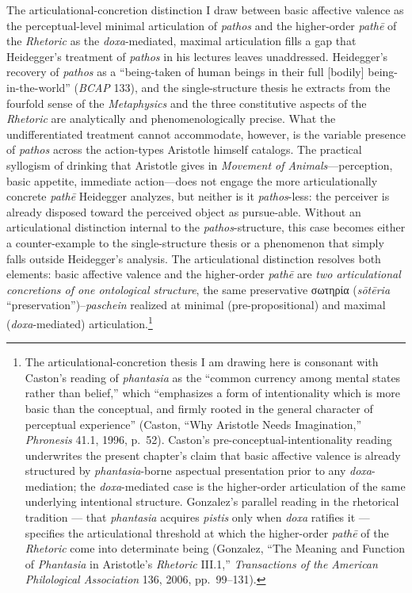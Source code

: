 \documentclass{article}
\newcommand{\gk}[1]{{\greekfont #1}}
\begin{document}
The articulational-concretion distinction I draw between basic affective valence as the perceptual-level minimal articulation of \textit{pathos} and the higher-order \textit{pathē} of the \textit{Rhetoric} as the \textit{doxa}-mediated, maximal articulation fills a gap that Heidegger's treatment of \textit{pathos} in his lectures leaves unaddressed. Heidegger's recovery of \textit{pathos} as a ``being-taken of human beings in their full [bodily] being-in-the-world'' (\textit{BCAP} 133), and the single-structure thesis he extracts from the fourfold sense of the \textit{Metaphysics} and the three constitutive aspects of the \textit{Rhetoric} are analytically and phenomenologically precise. What the undifferentiated treatment cannot accommodate, however, is the variable presence of \textit{pathos} across the action-types Aristotle himself catalogs. The practical syllogism of drinking that Aristotle gives in \textit{Movement of Animals}---perception, basic appetite, immediate action---does not engage the more articulationally concrete \textit{pathē} Heidegger analyzes, but neither is it \textit{pathos}-less: the perceiver is already disposed toward the perceived object as pursue-able. Without an articulational distinction internal to the \textit{pathos}-structure, this case becomes either a counter-example to the single-structure thesis or a phenomenon that simply falls outside Heidegger's analysis. The articulational distinction resolves both elements: basic affective valence and the higher-order \textit{pathē} are \textit{two articulational concretions of one ontological structure}, the same preservative \gk{σωτηρία} (\textit{sōtēria} ``preservation'')--\textit{paschein} realized at minimal (pre-propositional) and maximal (\textit{doxa}-mediated) articulation.\footnote{The articulational-concretion thesis I am drawing here is consonant with Caston's reading of \textit{phantasia} as the ``common currency among mental states rather than belief,'' which ``emphasizes a form of intentionality which is more basic than the conceptual, and firmly rooted in the general character of perceptual experience'' (Caston, ``Why Aristotle Needs Imagination,'' \textit{Phronesis} 41.1, 1996, p.~52). Caston's pre-conceptual-intentionality reading underwrites the present chapter's claim that basic affective valence is already structured by \textit{phantasia}-borne aspectual presentation prior to any \textit{doxa}-mediation; the \textit{doxa}-mediated case is the higher-order articulation of the same underlying intentional structure. Gonzalez's parallel reading in the rhetorical tradition --- that \textit{phantasia} acquires \textit{pistis} only when \textit{doxa} ratifies it --- specifies the articulational threshold at which the higher-order \textit{pathē} of the \textit{Rhetoric} come into determinate being (Gonzalez, ``The Meaning and Function of \textit{Phantasia} in Aristotle's \textit{Rhetoric} III.1,'' \textit{Transactions of the American Philological Association} 136, 2006, pp.~99--131).}
\end{document}
